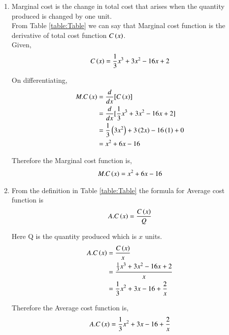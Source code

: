\documentclass[journal,12pt,twocolumn]{IEEEtran}
\begin{document}
\begin{enumerate}[ label=(\roman*)]
\item Marginal cost is the change in total cost that arises when the quantity produced is changed by one unit.\\
From Table
\eqref{table:Table}
we can say that Marginal cost function is the derivative of total cost function $C\left(x\right)$.\\
          
Given,
\begin{align}
  C\left(x\right) = \frac{1}{3}x^3 + 3x^2 - 16x +2
\end{align}
          
On differentiating,
\begin{align}
  M.C\left(x\right) &= \frac{d}{dx} [C\left(x\right)]\\
              &= \frac{d}{dx} [\frac{1}{3}x^3 + 3x^2 - 16x +2] \\
              &= \frac{1}{3}\left(3x^2\right) + 3\left(2x\right)-16\left(1\right)+0 \\
              &= x^2+6x-16
\end{align}  
          
Therefore the Marginal cost function is,
\begin{align*}
  M.C\left(x\right)=x^2+6x-16
\end{align*}        
      
\item From the definition in Table
\eqref{table:Table}
the formula for Average cost function is
\begin{align}
  A.C\left(x\right)=\frac{C\left(x\right)}{Q}
\end{align}
         
Here Q is the quantity produced which is $x$ units.
\begin{align}
  A.C\left(x\right) &=\frac{C\left(x\right)}{x} \\
              &=\frac{\frac{1}{3}x^3 + 3x^2 - 16x +2}{x} \\
              &=\frac{1}{3}x^2 + 3x - 16 +\frac{2}{x}
\end{align}    
                  
Therefore the Average cost function is,
\begin{align*}
  A.C\left(x\right)=\frac{1}{3}x^2 + 3x - 16 +\frac{2}{x}
\end{align*}
         
\end{enumerate}
  
\end{document}
